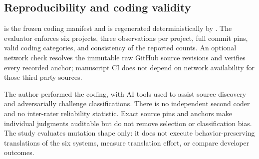 \subsection{Reproducibility and coding validity}
 is the frozen coding manifest and  is regenerated deterministically by . The evaluator enforces six projects, three observations per project, full commit pins, valid coding categories, and consistency of the reported counts. An optional network check resolves the immutable raw GitHub source revisions and verifies every recorded anchor; manuscript CI does not depend on network availability for those third-party sources.

The author performed the coding, with AI tools used to assist source discovery and adversarially challenge classifications. There is no independent second coder and no inter-rater reliability statistic. Exact source pins and anchors make individual judgments auditable but do not remove selection or classification bias. The study evaluates mutation shape only: it does not execute behavior-preserving translations of the six systems, measure translation effort, or compare developer outcomes.

